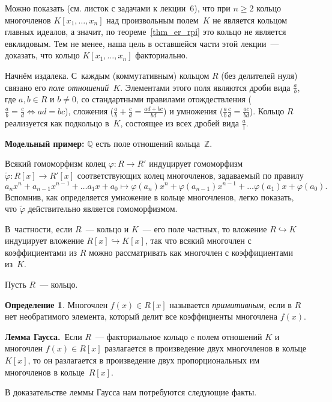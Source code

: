 \documentclass[a4paper,10pt]{amsart}
\def\ZZ{{\mathbb Z}}%
\def\QQ{{\mathbb Q}}%
\theoremstyle{definition}
\newtheorem{definition}{Определение}
\theoremstyle{remark}
\begin{document}
Можно показать (см. листок с задачами к лекции~6), что при $n
\geqslant 2$ кольцо многочленов $K[x_1, \ldots, x_n]$ над
произвольным полем~$K$ не является кольцом главных идеалов, а
значит, по теореме~\ref{thm_er_rpi} это кольцо не является
евклидовым. Тем не менее, наша цель в оставшейся части этой
лекции~--- доказать, что кольцо $K[x_1, \ldots, x_n]$ факториально.

Начнём издалека. С~каждым (коммутативным) кольцом $R$ (без делителей
нуля) связано его \textit{поле отношений}~$K$. Элементами этого поля
являются дроби вида $\frac{a}{b}$, где $a,b \in R$ и $b\ne 0$, со
стандартными правилами отождествления ($\frac{a}{b} = \frac{c}{d}
\Leftrightarrow ad = bc$), сложения ($\frac{a}{b} + \frac{c}{d} =
\frac{ad+bc}{bd}$) и умножения ($\frac{a}{b}\frac{c}{d} =
\frac{ac}{bd}$). Кольцо $R$ реализуется как подкольцо в~$K$,
состоящее из всех дробей вида $\frac{a}{1}$.

\textbf{Модельный пример:} $\QQ$ есть поле отношений кольца~$\ZZ$.

Всякий гомоморфизм колец $\varphi \colon R \to R'$ индуцирует
гомоморфизм $\widetilde \varphi \colon R[x] \to R'[x]$
соответствующих колец многочленов, задаваемый по правилу
$$
a_n x^n + a_{n-1} x^{n-1} + \ldots a_1 x + a_0 \mapsto \varphi(a_n)
x^n + \varphi(a_{n-1}) x^{n-1} + \ldots \varphi(a_1) x +
\varphi(a_0).
$$
Вспомнив, как определяется умножение в кольце многочленов, легко
показать, что $\widetilde \varphi$ действительно является
гомоморфизмом.

В~частности, если $R$~--- кольцо и $K$~--- его поле частных, то
вложение $R \hookrightarrow K$ индуцирует вложение $R[x]
\hookrightarrow K[x]$, так что всякий многочлен с коэффициентами из
$R$ можно рассматривать как многочлен с коэффициентами из~$K$.

Пусть $R$~--- кольцо.

\begin{definition}
Многочлен $f(x)\in R[x]$ называется {\it примитивным}, если в $R$
нет необратимого элемента, который делит все коэффициенты многочлена
$f(x)$.
\end{definition}

{\bf Лемма Гаусса.}\ Если $R$~--- факториальное кольцо c полем
отношений $K$ и многочлен $f(x) \in R[x]$ разлагается в произведение
двух многочленов в кольце $K[x]$, то он разлагается в произведение
двух пропорциональных им многочленов в кольце~$R[x]$.

В доказательстве леммы Гаусса нам потребуются следующие факты.
\end{document}
